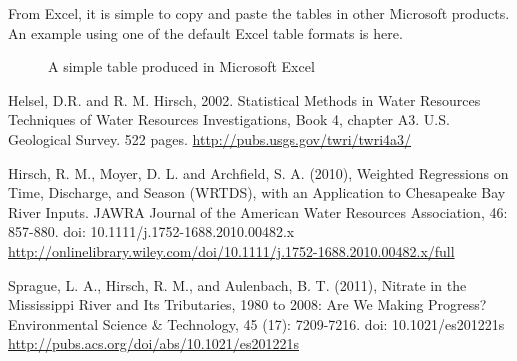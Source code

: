 \documentclass[a4paper,11pt]{article}\usepackage{graphicx, color}
\begin{document}
From Excel, it is simple to copy and paste the tables in other Microsoft products. An example using one of the default Excel table formats is here.

\begin{figure}[ht!]
\centering
\caption{A simple table produced in Microsoft Excel}
\label{overflow}
\end{figure}



\clearpage
\begin{thebibliography}{10}

Helsel, D.R. and R. M. Hirsch, 2002. Statistical Methods in Water Resources Techniques of Water Resources Investigations, Book 4, chapter A3. U.S. Geological Survey. 522 pages. \url{http://pubs.usgs.gov/twri/twri4a3/}

Hirsch, R. M., Moyer, D. L. and Archfield, S. A. (2010), Weighted Regressions on Time, Discharge, and Season (WRTDS), with an Application to Chesapeake Bay River Inputs. JAWRA Journal of the American Water Resources Association, 46: 857-880. doi: 10.1111/j.1752-1688.2010.00482.x \url{http://onlinelibrary.wiley.com/doi/10.1111/j.1752-1688.2010.00482.x/full}

Sprague, L. A., Hirsch, R. M., and Aulenbach, B. T. (2011), Nitrate in the Mississippi River and Its Tributaries, 1980 to 2008: Are We Making Progress? Environmental Science \& Technology, 45 (17): 7209-7216. doi: 10.1021/es201221s \url{http://pubs.acs.org/doi/abs/10.1021/es201221s}

\end{thebibliography}
\end{document}
